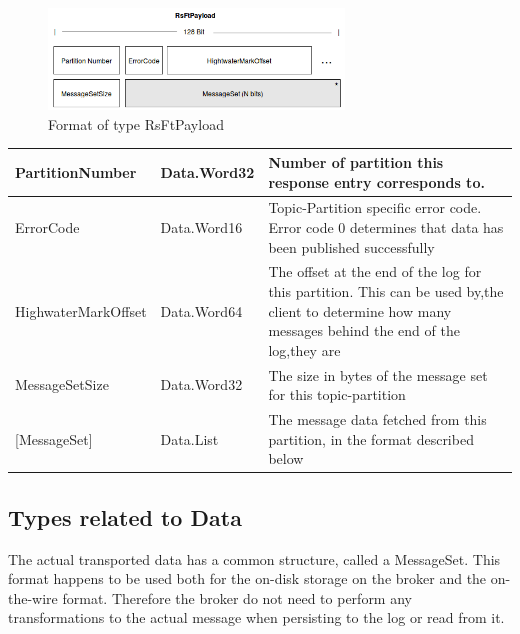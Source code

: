 \begin{figure}[H]
    \centering
    \includegraphics[width=0.7\textwidth]{images/impl-prot-types-ftPayload.png}
    \caption{Format of type RsFtPayload}
    \label{fig:impl-prot-types-ftPayload}
\end{figure}

\begin{table}[H]
\centering
\begin{tabular}{ l  l  p{10cm} }
\hline
PartitionNumber     & Data.Word32 & Number of partition this response entry corresponds to.                                                                                               \\ \hline
ErrorCode           & Data.Word16 & Topic-Partition specific error code. Error code 0 determines that data has been published successfully                                                \\ \hline
HighwaterMarkOffset & Data.Word64 & The offset at the end of the log for this partition. This can be used by,the client to determine how many messages behind the end of the log,they are \\ \hline
MessageSetSize      & Data.Word32 & The size in bytes of the message set for this topic-partition                                                                                         \\ \hline
{[}MessageSet{]}    & Data.List   & The message data fetched from this partition, in the format described below                                                                           \\ \hline
\end{tabular}
\end{table}

\subsection{Types related to Data}
\label{impl-protocol-types-data}
The actual transported data has a common structure,
called a MessageSet. This format happens to be used both for the on-disk storage on the
broker and the on-the-wire format. Therefore the broker do not need to perform
any transformations to the actual message when persisting to the log or read
from it. 

